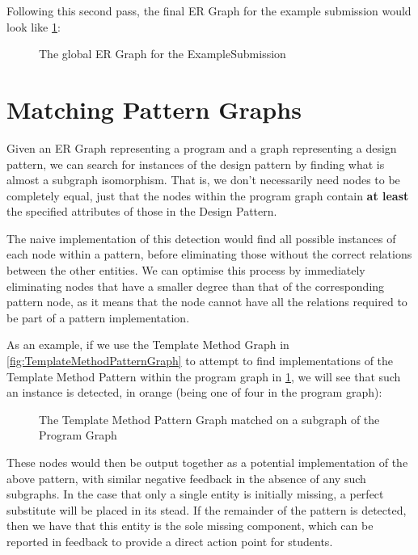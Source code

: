 Following this second pass, the final ER Graph for the example submission would look like \cref{fig:FullProgramGraph}:

\begin{figure}[H]
    \centering
    
    \caption{The global ER Graph for the ExampleSubmission}
    \label{fig:FullProgramGraph}
\end{figure}


\section{Matching Pattern Graphs}

Given an ER Graph representing a program and a graph representing a design pattern, we can search for instances of the design pattern by finding what is almost a subgraph isomorphism. That is, we don't necessarily need nodes to be completely equal, just that the nodes within the program graph contain \textbf{at least} the specified attributes of those in the Design Pattern.

The naive implementation of this detection would find all possible instances of each node within a pattern, before eliminating those without the correct relations between the other entities. We can optimise this process by immediately eliminating nodes that have a smaller degree than that of the corresponding pattern node, as it means that the node cannot have all the relations required to be part of a pattern implementation.

As an example, if we use the Template Method Graph in \cref{fig:TemplateMethodPatternGraph} to attempt to find implementations of the Template Method Pattern within the program graph in \cref{fig:FullProgramGraph}, we will see that such an instance is detected, in orange (being one of four in the program graph):

\begin{figure}[H]
    \centering
    
    \caption{The Template Method Pattern Graph matched on a subgraph of the Program Graph}
    \label{fig:TemplateMethodOnGraph}
\end{figure}

These nodes would then be output together as a potential implementation of the above pattern, with similar negative feedback in the absence of any such subgraphs. In the case that only a single entity is initially missing, a perfect substitute will be placed in its stead. If the remainder of the pattern is detected, then we have that this entity is the sole missing component, which can be reported in feedback to provide a direct action point for students.

